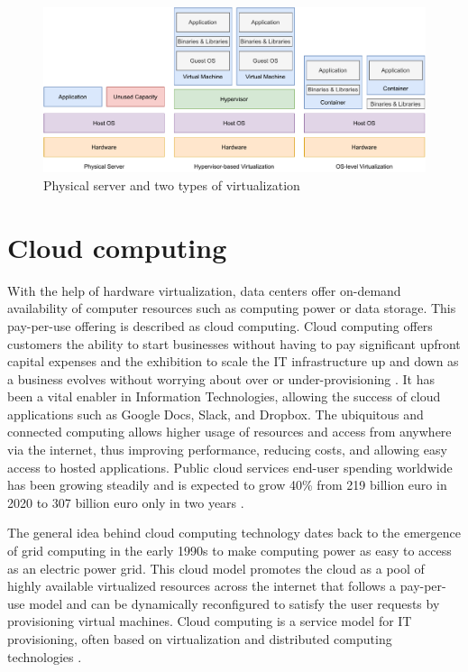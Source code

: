 \begin{figure}[ht]
  \begin{center}
    \includegraphics[width=13.5cm]{images/VirtualizationTypes.pdf}
    \caption{Physical server and two types of virtualization}
    \label{fig:VirtualizationTypes}
  \end{center}
\end{figure}

\section{Cloud computing}

With the help of hardware virtualization, data centers offer on-demand availability of computer resources such as computing power or data storage. This pay-per-use offering is described as cloud computing. Cloud computing offers customers the ability to start businesses without having to pay significant upfront capital expenses and the exhibition to scale the IT infrastructure up and down as a business evolves without worrying about over or under-provisioning \cite{Xing2012}. It has been a vital enabler in Information Technologies, allowing the success of cloud applications such as Google Docs, Slack, and Dropbox. The ubiquitous and connected computing allows higher usage of resources and access from anywhere via the internet, thus improving performance, reducing costs, and allowing easy access to hosted applications. Public cloud services end-user spending worldwide has been growing steadily and is expected to grow 40\% from 219 billion euro in 2020 to 307 billion euro only in two years \cite{PublicCloudStatista}.

The general idea behind cloud computing technology dates back to the emergence of grid computing in the early 1990s to make computing power as easy to access as an electric power grid. This cloud model promotes the cloud as a pool of highly available virtualized resources across the internet that follows a pay-per-use model and can be dynamically reconfigured to satisfy the user requests by provisioning virtual machines. Cloud computing is a service model for IT provisioning, often based on virtualization and distributed computing technologies \cite{Lombardi2011}. \cite{Xing2012}

